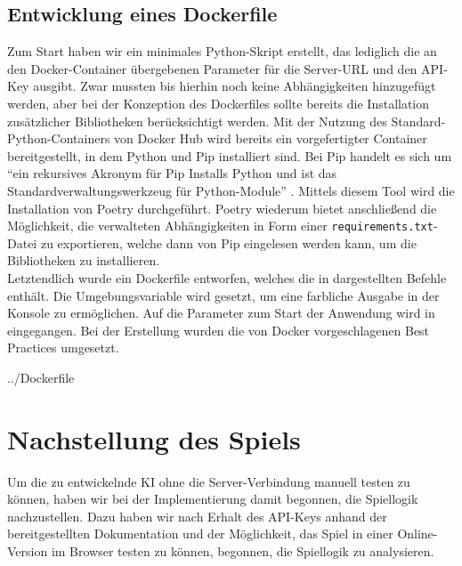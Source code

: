 \subsection{Entwicklung eines Dockerfile}
\label{subsec:dockerfile}

Zum Start haben wir ein minimales Python-Skript erstellt, das lediglich die an den Docker-Container übergebenen
Parameter für die Server-URL und den API-Key ausgibt.
Zwar mussten bis hierhin noch keine Abhängigkeiten hinzugefügt werden, aber bei der Konzeption des Dockerfiles sollte
bereits die Installation zusätzlicher Bibliotheken berücksichtigt werden.
Mit der Nutzung des Standard-Python-Containers von Docker Hub  wird bereits ein vorgefertigter
Container bereitgestellt, in dem Python und Pip installiert sind.
Bei Pip handelt es sich um "`ein rekursives Akronym für Pip Installs Python und ist das Standardverwaltungswerkzeug
für Python-Module"' .
Mittels diesem Tool wird die Installation von Poetry durchgeführt.
Poetry wiederum bietet anschließend die Möglichkeit, die verwalteten Abhängigkeiten in Form einer
\texttt{requirements.txt}-Datei zu exportieren, welche dann von Pip eingelesen werden kann, um die Bibliotheken zu
installieren. \\

Letztendlich wurde ein Dockerfile entworfen, welches die in  dargestellten Befehle enthält.
Die Umgebungsvariable  wird gesetzt, um eine farbliche Ausgabe in der Konsole zu ermöglichen.
Auf die Parameter zum Start der Anwendung wird in  eingegangen.
Bei der Erstellung wurden die von Docker vorgeschlagenen Best Practices  umgesetzt.


{../Dockerfile}

\section{Nachstellung des Spiels}
\label{sec:nachstellung-spiel}

Um die zu entwickelnde \ac{KI} ohne die Server-Verbindung manuell testen zu können, haben wir bei der Implementierung
damit begonnen, die Spiellogik nachzustellen.
Dazu haben wir nach Erhalt des API-Keys anhand der bereitgestellten Dokumentation und der Möglichkeit, das Spiel in
einer Online-Version im Browser testen zu können, begonnen, die Spiellogik zu analysieren. \\

